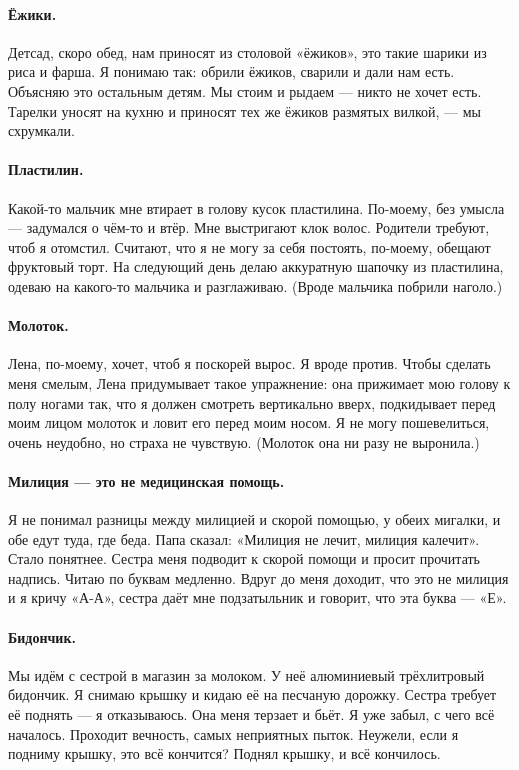 \documentclass{book}
\begin{document}
\paragraph{Ёжики.}
Детсад, скоро обед, нам приносят из столовой «ёжиков»,
это такие шарики из риса и фарша.
Я понимаю так: обрили ёжиков, сварили и дали нам есть.
Объясняю это остальным детям.
Мы стоим и рыдаем --- никто не хочет есть.
Тарелки уносят на кухню и приносят тех же ёжиков размятых вилкой, --- мы схрумкали.

\paragraph{Пластилин.}
Какой-то мальчик мне втирает в голову кусок пластилина.
По-моему, без умысла --- задумался о чём-то и втёр.
Мне выстригают клок волос.
Родители требуют, чтоб я отомстил.
Считают, что я не могу за себя постоять,
по-моему, обещают фруктовый торт.
На следующий день делаю аккуратную шапочку из пластилина,
одеваю на какого-то мальчика и разглаживаю.
(Вроде мальчика побрили наголо.)

\paragraph{Молоток.}
Лена, по-моему, хочет, чтоб я поскорей вырос. 
Я вроде против.
Чтобы сделать меня смелым, Лена придумывает такое упражнение:
она прижимает мою голову к полу ногами так, что я должен смотреть вертикально вверх, подкидывает перед моим лицом молоток и ловит его перед моим носом.
Я не могу пошевелиться, очень неудобно, но страха  не чувствую.
(Молоток она ни разу не выронила.)

\paragraph{Милиция --- это не медицинская помощь.}
Я не понимал разницы между милицией и скорой помощью,
у обеих мигалки,
и обе едут туда, где беда.
Папа сказал:
«Милиция не лечит, милиция калечит».
Стало понятнее.
Сестра меня подводит к скорой помощи и просит прочитать надпись.
Читаю по буквам медленно.
Вдруг до меня доходит, что это не милиция и я кричу «А-А»,
сестра даёт мне подзатыльник и говорит, что эта буква --- «Е».

\paragraph{Бидончик.}
Мы идём с сестрой в магазин за молоком.
У неё алюминиевый трёхлитровый бидончик.
Я снимаю крышку и кидаю её на песчаную дорожку.
Сестра требует её поднять --- я отказываюсь.
Она меня терзает и бьёт.
Я уже забыл, с чего всё началось.
Проходит вечность, самых неприятных пыток.
Неужели, если я подниму крышку, это всё кончится?
Поднял крышку, и всё кончилось.
\end{document}
